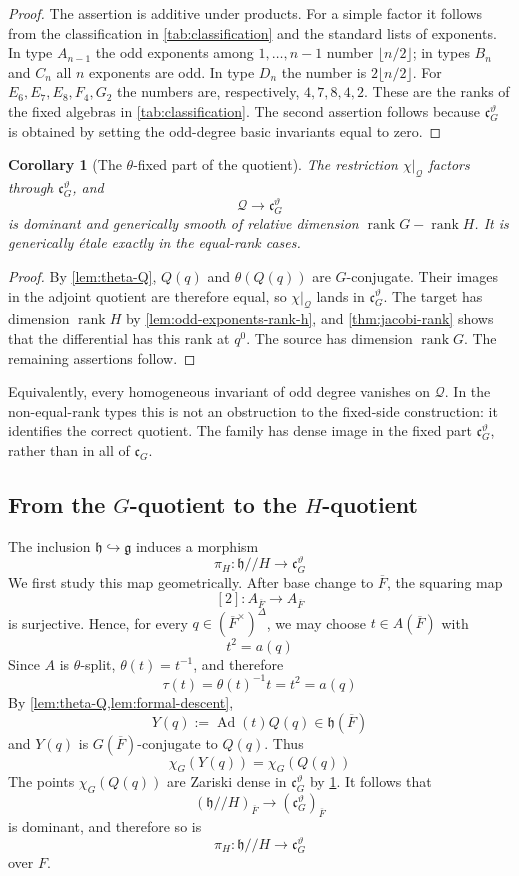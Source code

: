 \documentclass[11pt]{amsart}
\newtheorem{corollary}[corollary]{Corollary}
\theoremstyle{definition}
\theoremstyle{remark}
\newcommand{\Fb}{\overline F}
\newcommand{\cQ}{\mathcal Q}
\newcommand{\Ad}{\operatorname{Ad}}
\newcommand{\rank}{\operatorname{rank}}
\newcommand{\cC}{\mathfrak c}
\newcommand{\g}{\mathfrak g}
\newcommand{\h}{\mathfrak h}
\begin{document}
\begin{proof}
The assertion is additive under products.  For a simple factor it follows
from the classification in \cref{tab:classification} and the standard lists
of exponents.  In type $A_{n-1}$ the odd exponents among
$1,\ldots,n-1$ number $\lfloor n/2\rfloor$; in types $B_n$ and $C_n$ all
$n$ exponents are odd.  In type $D_n$ the number is
$2\lfloor n/2\rfloor$.  For $E_6,E_7,E_8,F_4,G_2$ the numbers are,
respectively, $4,7,8,4,2$.  These are the ranks of the fixed
algebras in \cref{tab:classification}.  The second assertion follows because
$\cC_G^\vartheta$ is obtained by setting the odd-degree basic invariants equal
to zero.
\end{proof}

\begin{corollary}[The $\theta$-fixed part of the quotient]
\label{cor:jacobi-fixed-quotient}
The restriction $\chi|_{\cQ}$ factors through $\cC_G^\vartheta$, and
\[
 \cQ\longrightarrow\cC_G^\vartheta
\]
is dominant and generically smooth of relative dimension
$\rank G-\rank H$.  It is generically \'etale exactly in the equal-rank cases.
\end{corollary}

\begin{proof}
By \cref{lem:theta-Q}, $Q(q)$ and $\theta(Q(q))$ are $G$-conjugate.  Their
images in the adjoint quotient are therefore equal, so $\chi|_{\cQ}$ lands in $\cC_G^\vartheta$.  The target has dimension $\rank H$ by
\cref{lem:odd-exponents-rank-h}, and \cref{thm:jacobi-rank} shows that the
differential has this rank at $q^0$.  The source has dimension $\rank G$.
The remaining assertions follow.
\end{proof}

Equivalently, every homogeneous invariant of odd degree vanishes on $\cQ$.
In the non-equal-rank types this is not an obstruction to the fixed-side
construction: it identifies the correct quotient.  The family has dense image in the
fixed part $\cC_G^\vartheta$, rather than in all of $\cC_G$.

\subsection{\texorpdfstring{From the $G$-quotient to the $H$-quotient}{From the G-quotient to the H-quotient}}

The inclusion $\h\hookrightarrow\g$ induces a morphism
\[
 \pi_H:\h/\!/H\longrightarrow \cC_G^\vartheta
\]
We first study this map geometrically.  After base change to $\Fb$, the
squaring map
\[
 [2]:A_{\Fb}\longrightarrow A_{\Fb}
\]
is surjective.  Hence, for every $q\in(\Fb^\times)^\Delta$, we may choose
$t\in A(\Fb)$ with
\[
 t^2=a(q)
\]
Since $A$ is $\theta$-split, $\theta(t)=t^{-1}$, and therefore
\[
 \tau(t)=\theta(t)^{-1}t=t^2=a(q)
\]
By \cref{lem:theta-Q,lem:formal-descent},
\[
 Y(q):=\Ad(t)Q(q)\in\h(\Fb)
\]
and $Y(q)$ is $G(\Fb)$-conjugate to $Q(q)$.  Thus
\[
 \chi_G(Y(q))=\chi_G(Q(q))
\]
The points $\chi_G(Q(q))$ are Zariski dense in $\cC_G^\vartheta$ by
\cref{cor:jacobi-fixed-quotient}.  It follows that
\[
 (\h/\!/H)_{\Fb}\longrightarrow(\cC_G^\vartheta)_{\Fb}
\]
is dominant, and therefore so is
\[
 \pi_H:\h/\!/H\longrightarrow\cC_G^\vartheta
\]
over $F$.
\end{document}

